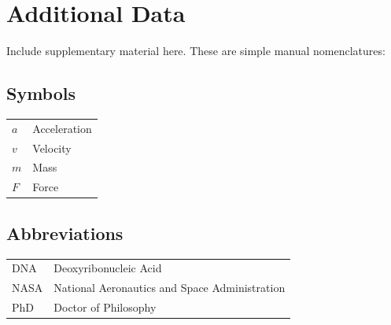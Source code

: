 \cleardoublepage %

\appendix	

\chapter{Additional Data}

Include supplementary material here. These are simple manual nomenclatures:

\section*{Symbols}
\begin{tabular}{ll}
$a$ & Acceleration \\
$v$ & Velocity \\
$m$ & Mass \\
$F$ & Force \\
\end{tabular}

\section*{Abbreviations}
\begin{tabular}{ll}
DNA & Deoxyribonucleic Acid \\
NASA & National Aeronautics and Space Administration \\
PhD & Doctor of Philosophy \\
\end{tabular}

